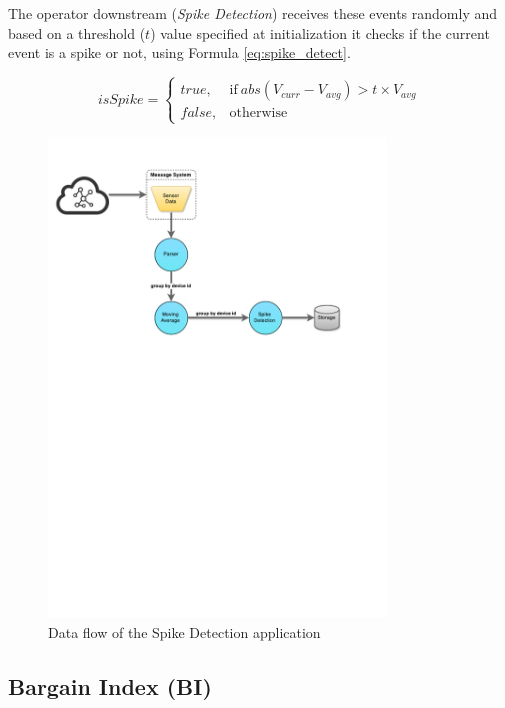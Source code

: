 \documentclass[ppgc,diss,english]{iiufrgs}
\begin{document}
The operator downstream (\emph{Spike Detection}) receives these events randomly and based on a threshold ($t$) value specified at initialization it checks if the current event is a spike or not, using Formula \ref{eq:spike_detect}.

\begin{equation}\label{eq:spike_detect}
    isSpike=
    \begin{cases}
      true, & \text{if}\ abs( V_{curr} - V_{avg} ) > t \times V_{avg} \\
      false, & \text{otherwise}
    \end{cases}
\end{equation}

\begin{figure}[!ht]
	\centering
	\includegraphics[width=0.8\textwidth]{images/apps/SpikeDetection.pdf}
	\caption{Data flow of the Spike Detection application}
	\label{fig:app_spike_detection}
\end{figure}

\subsection{Bargain Index (BI)}
\end{document}
